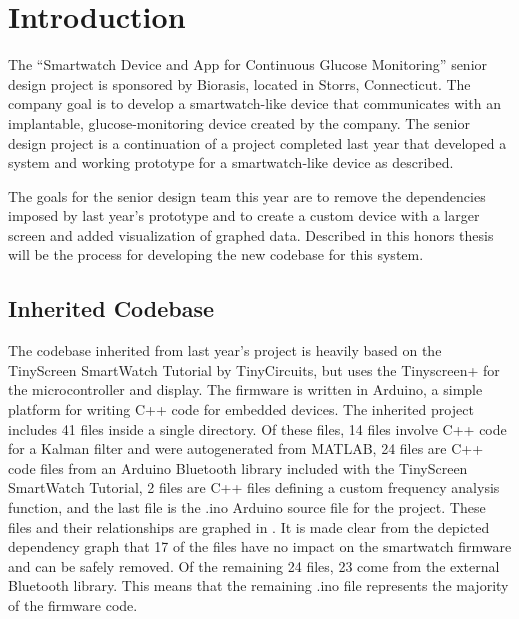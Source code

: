 \chapter{Introduction}
\label{introchap}

The ``Smartwatch Device and App for Continuous Glucose Monitoring'' senior design project\cite{ecesd1814} is sponsored by Biorasis\cite{Biorasis}, located in Storrs, Connecticut. The company goal is to develop a smartwatch-like device that communicates with an implantable, glucose-monitoring device created by the company. The senior design project is a continuation of a project\cite{ecesd1714} completed last year that developed a system and working prototype for a smartwatch-like device as described.

The goals for the senior design team this year are to remove the dependencies imposed by last year's prototype and to create a custom device with a larger screen and added visualization of graphed data. Described in this honors thesis will be the process for developing the new codebase for this system.

\section{Inherited Codebase}

The codebase inherited from last year's project is heavily based on the TinyScreen SmartWatch Tutorial by TinyCircuits\cite{tinywatchtut}, but uses the Tinyscreen+\cite{tinyplus} for the microcontroller and display. The firmware is written in Arduino, a simple platform for writing C++ code for embedded devices. The inherited project includes 41 files inside a single directory. Of these files, 14 files involve C++ code for a Kalman filter and were autogenerated from MATLAB, 24 files are C++ code files from an Arduino Bluetooth library included with the TinyScreen SmartWatch Tutorial, 2 files are C++ files defining a custom frequency analysis function, and the last file is the .ino Arduino source file for the project. These files and their relationships are graphed in . It is made clear from the depicted dependency graph that 17 of the files have no impact on the smartwatch firmware and can be safely removed. Of the remaining 24 files, 23 come from the external Bluetooth library. This means that the remaining .ino file represents the majority of the firmware code.

